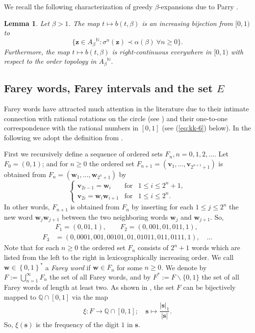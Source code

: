 \documentclass[11pt]{amsart}
\newtheorem{lemma}[theorem]{Lemma}
\theoremstyle{definition}
\theoremstyle{remark}
\numberwithin{equation}{section}
\newcommand{\N}{\ensuremath{\mathbb{N}}}
\newcommand{\F}{F^*}
\newcommand{\s}{ {\mathbf{s}}}
\renewcommand{\v}{\mathbf{v}}
\newcommand{\w}{\mathbf{w}}
\newcommand{\z}{\mathbf{z}}
\newcommand{\set}[1]{\left\{#1\right\}}
\newcommand{\f}{\infty}
\newcommand{\al}{\alpha}
\newcommand{\si}{\sigma}
\begin{document}
We recall the following characterization of greedy $\beta$-expansions due to Parry \cite{Parry_1960}.

\begin{lemma} \label{lem:greedy-expansion}
Let $\beta{>1}$. The map $t\mapsto b(t,\beta)$ is an increasing bijection from $[0,1)$ to
\[
\big\{\z\in {A_\beta}^\N: \si^n(\z)\prec \al(\beta)~\forall n\ge 0\big\}.
\]
Furthermore, the map $t\mapsto b(t,\beta)$ is right-continuous everywhere in $[0,1)$ with respect to the order topology in ${A_\beta}^\N$.
\end{lemma}


\subsection{Farey words, Farey intervals and the set $E$}

 Farey words have attracted much attention in the literature due to their intimate connection with rational rotations on the circle (see \cite[Chapter 2]{Lothaire-2002}) and their one-to-one correspondence with the rational numbers in $[0,1]$ (see {(\ref{eq:kk-6})} below). In the following we adopt the definition from \cite{Carminati-Isola-Tiozzo-2018}.

 First we recursively define a sequence of ordered sets $F_n, n=0,1,2,\ldots$. Let $F_0=(0,1)$; and for $n\ge 0$ the ordered set $F_{n+1}=(\v_1, \ldots, \v_{2^{n+1}+1})$ is obtained from $F_{n}=(\w_1,\ldots, \w_{2^n+1})$ by
 \[
 \left\{
 \begin{array}
   {lll}
   \v_{2i-1}=\w_i&\textrm{for}& 1\le i\le 2^{n}+1,\\
   \v_{2i}=\w_i\w_{i+1}&\textrm{for}& 1\le i\le 2^n.
 \end{array}\right.
 \]
In other words, $F_{n+1}$ is obtained from $F_n$ by inserting for each $1\le j\le 2^{n}$ the new word $\w_j\w_{j+1}$ between the two neighboring words $\w_j$ and $\w_{j+1}$. So,
 \begin{equation*} %
 \begin{split}
 &F_1=(0,01,1),\qquad F_2=(0,001,01,011,1),\\
  F_3&=(0,0001,001,00101,01,01011,011,0111,1), \quad \dots
 \end{split}
 \end{equation*}
Note that for each $n\ge 0$ the ordered set $F_n$ consists of $2^n+1$ words which are listed from the left to the right in lexicographically increasing order.
We call $\w\in\set{0,1}^*$ a \emph{Farey word} if $\w\in F_n$ for some $n\ge 0$. We denote by $F:=\bigcup_{n=1}^\f F_n$ the set of all Farey words, and by $\F:=F\backslash\{0,1\}$ the set of all Farey words of length at least two. As shown in \cite[Proposition 2.3]{Carminati-Isola-Tiozzo-2018}, the set $F$ can be bijectively mapped to $\mathbb{Q}\cap[0,1]$ via the map
\begin{equation} \label{eq:kk-6}
\xi: F\to\mathbb Q\cap[0,1];\quad \s\mapsto\frac{|\s|_1}{|\s|}.
\end{equation}
So, $\xi(\s)$ is the frequency of the digit $1$ in $\s$.
\end{document}
